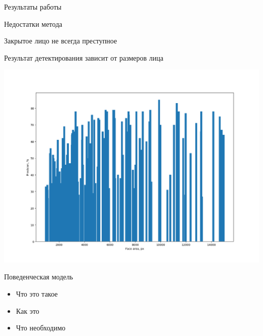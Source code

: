 \documentclass[
  russian,
  ignorenonframetext,
]{beamer}
\providecommand{\tightlist}{%
  \setlength{\itemsep}{0pt}\setlength{\parskip}{0pt}}
\begin{document}
\begin{frame}
\begin{block}{Результаты работы}
\begin{block}{}
\end{block}

\end{block}

\begin{block}{Недостатки метода}

\begin{block}{Закрытое лицо не всегда преступное}

\end{block}

\begin{block}{Результат детектирования зависит от размеров лица}

\end{block}

\begin{block}{}

\includegraphics{pics/graph.png}

\end{block}

\end{block}

\begin{block}{Поведенческая модель}

\begin{itemize}
\tightlist
\item
  Что это такое
\item
  Как это
\item
  Что необходимо
\end{itemize}

\end{block}


\end{frame}
\end{document}
